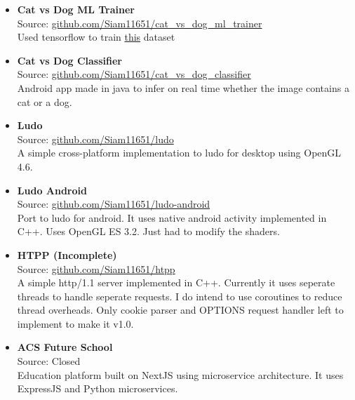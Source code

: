
\begin{itemize}
  \item {
      \textbf{Cat vs Dog ML Trainer} \\
      Source: \href{https://github.com/Siam11651/cat_vs_dog_ml_trainer}{github.com/Siam11651/cat\_vs\_dog\_ml\_trainer} \\
      Used tensorflow to train \href{https://www.kaggle.com/competitions/dogs-vs-cats}{this} dataset
    }
  \item {
    \textbf{Cat vs Dog Classifier} \\
    Source: \href{https://github.com/Siam11651/cat_vs_dog_classifier}{github.com/Siam11651/cat\_vs\_dog\_classifier} \\
    Android app made in java to infer on real time whether the image contains a cat or a dog.
  }
  \item {
    \textbf{Ludo} \\
    Source: \href{https://github.com/Siam11651/ludo}{github.com/Siam11651/ludo} \\
    A simple cross-platform implementation to ludo for desktop using OpenGL 4.6.
  }
  \item {
    \textbf{Ludo Android} \\
    Source: \href{https://github.com/Siam11651/ludo-android}{github.com/Siam11651/ludo-android} \\
    Port to ludo for android. It uses native android activity implemented in C++. Uses OpenGL ES 3.2. Just had to modify the shaders.
  }
  \item {
    \textbf{HTPP (Incomplete)} \\
    Source: \href{https://github.com/Siam11651/htpp}{github.com/Siam11651/htpp} \\
    A simple http/1.1 server implemented in C++. Currently it uses seperate threads to handle seperate requests. I do intend to use coroutines to reduce thread overheads. Only cookie parser and OPTIONS request handler left to implement to make it v1.0.
  }
  \item {
    \textbf{ACS Future School} \\
    Source: Closed \\
    Education platform built on NextJS using microservice architecture. It uses ExpressJS and Python microservices.
  }
\end{itemize}